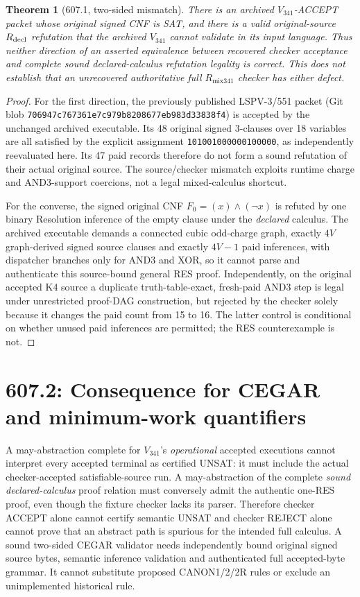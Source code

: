 \documentclass[11pt]{article}
\newtheorem{theorem}{Theorem}
\begin{document}
\begin{theorem}[607.1, two-sided mismatch]
There is an archived \(V_{341}\)-ACCEPT packet whose original signed CNF is SAT, and there is a valid original-source \(R_{\rm decl}\) refutation that the archived \(V_{341}\) cannot validate in its input language. Thus neither direction of an asserted equivalence between recovered checker acceptance and complete sound declared-calculus refutation legality is correct. This does not establish that an unrecovered authoritative full \(R_{\mathrm{mix341}}\) checker has either defect.
\end{theorem}
\begin{proof}
For the first direction, the previously published LSPV-3/551 packet (Git blob \texttt{706947c767361e7c979b8208677eb983d33838f4}) is accepted by the unchanged archived executable. Its 48 original signed 3-clauses over 18 variables are all satisfied by the explicit assignment \texttt{101001000000100000}, as independently reevaluated here. Its 47 paid records therefore do not form a sound refutation of their actual original source. The source/checker mismatch exploits runtime charge and AND3-support coercions, not a legal mixed-calculus shortcut.

For the converse, the signed original CNF \(F_0=(x)\wedge(\neg x)\) is refuted by one binary Resolution inference of the empty clause under the \emph{declared} calculus. The archived executable demands a connected cubic odd-charge graph, exactly \(4V\) graph-derived signed source clauses and exactly \(4V-1\) paid inferences, with dispatcher branches only for AND3 and XOR, so it cannot parse and authenticate this source-bound general RES proof. Independently, on the original accepted K4 source a duplicate truth-table-exact, fresh-paid AND3 step is legal under unrestricted proof-DAG construction, but rejected by the checker solely because it changes the paid count from 15 to 16. The latter control is conditional on whether unused paid inferences are permitted; the RES counterexample is not.
\end{proof}

\section*{607.2: Consequence for CEGAR and minimum-work quantifiers}
A may-abstraction complete for \(V_{341}\)'s \emph{operational} accepted executions cannot interpret every accepted terminal as certified UNSAT: it must include the actual checker-accepted satisfiable-source run. A may-abstraction of the complete \emph{sound declared-calculus} proof relation must conversely admit the authentic one-RES proof, even though the fixture checker lacks its parser. Therefore checker ACCEPT alone cannot certify semantic UNSAT and checker REJECT alone cannot prove that an abstract path is spurious for the intended full calculus. A sound two-sided CEGAR validator needs independently bound original signed source bytes, semantic inference validation and authenticated full accepted-byte grammar. It cannot substitute proposed CANON1/2/2R rules or exclude an unimplemented historical rule.
\end{document}
